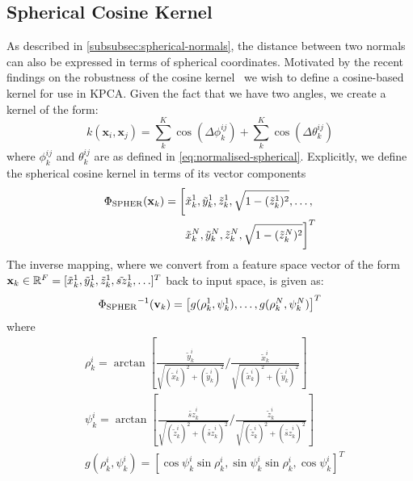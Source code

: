 \subsection{Spherical Cosine Kernel}\label{subsec:singl_img_cosine_kernel}
As described in \cref{subsubsec:spherical-normals}, the distance between
two normals can also be expressed in terms of spherical coordinates. Motivated
by the recent findings on the robustness of the cosine 
kernel~\cite{tzimiropoulos2012subspace,tzimiropoulos2010robust} 
we wish to define a cosine-based kernel for use in KPCA. Given the
fact that we have two angles, we create a kernel of the form:
\begin{equation}\label{eq:spher-cosine-kernel}
    k(\mathbf{x}_i, \mathbf{x}_j) = \sum^K_k \cos(\Delta \phi^{ij}_k) + \sum^K_k \cos(\Delta \theta^{ij}_k)
\end{equation}
where $\phi^{ij}_k$ and $\theta^{ij}_k$ are as defined in 
\cref{eq:normalised-spherical}. Explicitly, we define the spherical 
cosine kernel in terms of its vector components
\begin{equation}
    \begin{aligned}\label{eq:spher-kernel}
        \Phi_{\operatorname{SPHER}} (\boldsymbol{\mathbf{x}}_k) = \left[
                    \tilde{x}_k^1, \tilde{y}_k^1, \tilde{z}_k^1, \sqrt{1 - (\tilde{z}_k^1)^2}, \ldots, \right. \\
                    \left. \tilde{x}_k^N, \tilde{y}_k^N, \tilde{z}_k^N, \sqrt{1 - (\tilde{z}_k^N)^2}
                \right]^T
    \end{aligned}
\end{equation}
The inverse mapping, where we convert from a feature space vector of the form
$\mathbf{x}_k \in \mathbb{R}^F = [\tilde{x}_k^1, \tilde{y}_k^1, \tilde{z}_k^1,\tilde{sz}_k^1, \ldots]^T$ 
back to input space, is given as:
\begin{equation}\label{eq:inv-spher-kernel}
    {\Phi_{\operatorname{SPHER}}}^{-1} (\boldsymbol{\mathbf{v}}_k) = \left[ g (\rho_k^1, \psi_k^1), \ldots, g (\rho_k^N, \psi_k^N) \right]^T
\end{equation}
where 
\begin{equation}
    \begin{aligned}\label{eq:inv-spher-g}
        &\rho_k^i = \arctan [ \frac{\tilde{y}_k^i}{\sqrt{(\tilde{x}_k^i)^2 + (\tilde{y}_k^i)^2}} / \frac{\tilde{x}_k^i}{\sqrt{(\tilde{x}_k^i)^2 + (\tilde{y}_k^i)^2}} ] \\
        &\psi_k^i = \arctan [ \frac{\tilde{sz}_k^i}{\sqrt{(\tilde{z}_k^i)^2 + (\tilde{sz}_k^i)^2}} / \frac{\tilde{z}_k^i}{\sqrt{(\tilde{z}_k^i)^2 + (\tilde{sz}_k^i)^2}} ] \\
        &g(\rho_k^i, \psi_k^i) = [\cos \psi_k^i \sin \rho_k^i, \sin \psi_k^i \sin \rho_k^i, \cos \psi_k^i]^T
    \end{aligned}
\end{equation}
